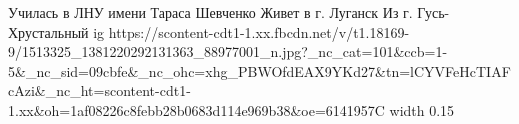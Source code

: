  
 
 
 
 

\par
Училась в ЛНУ имени Тараса Шевченко
Живет в г. Луганск
Из г. Гусь-Хрустальный
\ifcmt
  ig https://scontent-cdt1-1.xx.fbcdn.net/v/t1.18169-9/1513325_1381220292131363_88977001_n.jpg?_nc_cat=101&ccb=1-5&_nc_sid=09cbfe&_nc_ohc=xhg_PBWOfdEAX9YKd27&tn=lCYVFeHcTIAFcAzi&_nc_ht=scontent-cdt1-1.xx&oh=1af08226c8febb28b0683d114e969b38&oe=6141957C
  width 0.15
\fi

